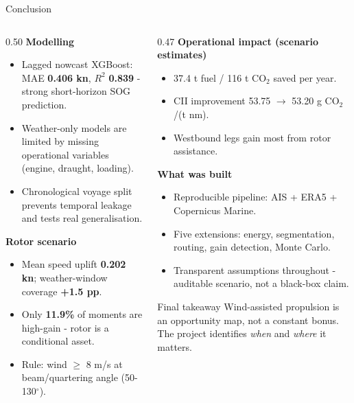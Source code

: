 \documentclass[aspectratio=169]{beamer}
\begin{document}
\begin{frame}{Conclusion}
\footnotesize
\begin{columns}
\begin{column}{0.50\textwidth}
\textbf{Modelling}
\begin{itemize}
  \item Lagged nowcast XGBoost: MAE \textbf{0.406 kn}, $R^2$ \textbf{0.839} - strong short-horizon SOG prediction.
  \item Weather-only models are limited by missing operational variables (engine, draught, loading).
  \item Chronological voyage split prevents temporal leakage and tests real generalisation.
\end{itemize}
\vspace{0.15cm}
\textbf{Rotor scenario}
\begin{itemize}
  \item Mean speed uplift \textbf{0.202 kn}; weather-window coverage \textbf{+1.5 pp}.
  \item Only \textbf{11.9\%} of moments are high-gain - rotor is a conditional asset.
  \item Rule: wind $\geq$ 8 m/s at beam/quartering angle (50-130$^\circ$).
\end{itemize}
\end{column}
\begin{column}{0.47\textwidth}
\textbf{Operational impact (scenario estimates)}
\begin{itemize}
  \item 37.4 t fuel / 116 t CO$_2$ saved per year.
  \item CII improvement 53.75 $\to$ 53.20 g CO$_2$/(t nm).
  \item Westbound legs gain most from rotor assistance.
\end{itemize}
\vspace{0.15cm}
\textbf{What was built}
\begin{itemize}
  \item Reproducible pipeline: AIS + ERA5 + Copernicus Marine.
  \item Five extensions: energy, segmentation, routing, gain detection, Monte Carlo.
  \item Transparent assumptions throughout - auditable scenario, not a black-box claim.
\end{itemize}

\begin{block}{Final takeaway}
Wind-assisted propulsion is an opportunity map, not a constant bonus. The project identifies \textit{when} and \textit{where} it matters.
\end{block}
\end{column}
\end{columns}
\end{frame}
\end{document}
